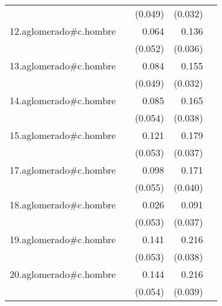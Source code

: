 {\begin{longtable}{l*{4}{D{.}{.}{-1}}}
            &                     &     (0.049)         &     (0.032)         &                     \\
\addlinespace
12.aglomerado#c.hombre&                     &       0.064         &       0.136\sym{***}&                     \\
            &                     &     (0.052)         &     (0.036)         &                     \\
\addlinespace
13.aglomerado#c.hombre&                     &       0.084         &       0.155\sym{***}&                     \\
            &                     &     (0.049)         &     (0.032)         &                     \\
\addlinespace
14.aglomerado#c.hombre&                     &       0.085         &       0.165\sym{***}&                     \\
            &                     &     (0.054)         &     (0.038)         &                     \\
\addlinespace
15.aglomerado#c.hombre&                     &       0.121\sym{*}  &       0.179\sym{***}&                     \\
            &                     &     (0.053)         &     (0.037)         &                     \\
\addlinespace
17.aglomerado#c.hombre&                     &       0.098         &       0.171\sym{***}&                     \\
            &                     &     (0.055)         &     (0.040)         &                     \\
\addlinespace
18.aglomerado#c.hombre&                     &       0.026         &       0.091\sym{*}  &                     \\
            &                     &     (0.053)         &     (0.037)         &                     \\
\addlinespace
19.aglomerado#c.hombre&                     &       0.141\sym{**} &       0.216\sym{***}&                     \\
            &                     &     (0.053)         &     (0.038)         &                     \\
\addlinespace
20.aglomerado#c.hombre&                     &       0.144\sym{**} &       0.216\sym{***}&                     \\
            &                     &     (0.054)         &     (0.039)         &                     \\

\end{longtable}}

